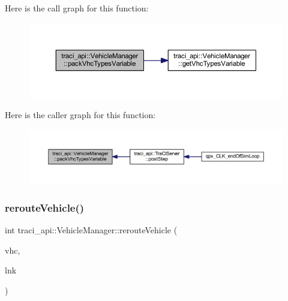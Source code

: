 Here is the call graph for this function\+:
\nopagebreak
\begin{figure}[H]
\begin{center}
\leavevmode
\includegraphics[width=350pt]{classtraci__api_1_1_vehicle_manager_abf96c7635d046d03bc02aa0cbc384d17_cgraph}
\end{center}
\end{figure}
Here is the caller graph for this function\+:
\nopagebreak
\begin{figure}[H]
\begin{center}
\leavevmode
\includegraphics[width=350pt]{classtraci__api_1_1_vehicle_manager_abf96c7635d046d03bc02aa0cbc384d17_icgraph}
\end{center}
\end{figure}
\mbox{\label{classtraci__api_1_1_vehicle_manager_a47a471305d82ae97f65ac2c90f384baa}} 
\subsubsection{\texorpdfstring{reroute\+Vehicle()}{rerouteVehicle()}}
{\footnotesize\ttfamily int traci\+\_\+api\+::\+Vehicle\+Manager\+::reroute\+Vehicle (\begin{DoxyParamCaption}\item[{V\+E\+H\+I\+C\+LE $\ast$}]{vhc,  }\item[{L\+I\+NK $\ast$}]{lnk }\end{DoxyParamCaption})}

